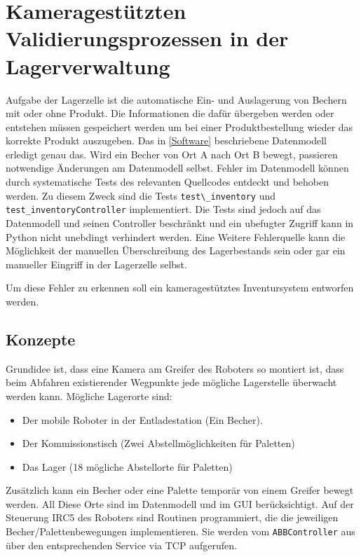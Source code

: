 \chapter{Kameragestützten Validierungsprozessen in der Lagerverwaltung}\label{KameragestützteInventur}

Aufgabe der Lagerzelle ist die automatische Ein- und Auslagerung von Bechern mit oder ohne Produkt.
Die Informationen die dafür übergeben werden oder entstehen müssen gespeichert werden um bei einer Produktbestellung wieder das korrekte Produkt auszugeben.
Das in \ref{Software} beschriebene Datenmodell erledigt genau das. Wird ein Becher von Ort A nach Ort B bewegt, 
passieren notwendige Änderungen am Datenmodell selbst. Fehler im Datenmodell können durch systematische Tests des relevanten Quellcodes entdeckt und behoben werden. 
Zu diesem Zweck sind die Tests \verb|test\_inventory| und \verb|test_inventoryController| implementiert. 
Die Tests sind jedoch auf das Datenmodell und seinen Controller beschränkt und ein \glq ubefugter \grq Zugriff kann in Python nicht unebdingt verhindert werden. 
Eine Weitere Fehlerquelle kann die Möglichkeit der manuellen Überschreibung des Lagerbestands sein oder gar ein manueller Eingriff in der Lagerzelle selbst. 

Um diese Fehler zu erkennen soll ein kameragestütztes Inventursystem entworfen werden. 
    \section {Konzepte}
    Grundidee ist, dass eine Kamera am Greifer des Roboters so montiert ist, dass beim Abfahren existierender Wegpunkte jede mögliche Lagerstelle überwacht werden kann. 
    Mögliche Lagerorte sind:
    \begin{itemize}
        \item Der mobile Roboter in der Entladestation (Ein Becher). 
        \item Der Kommissionstisch (Zwei Abstellmöglichkeiten für Paletten)
        \item Das Lager (18 mögliche Abstellorte für Paletten)
    \end{itemize}
    Zusätzlich kann ein Becher oder eine Palette temporär von einem Greifer bewegt werden. All Diese Orte sind im Datenmodell und im GUI berücksichtigt. 
    Auf der Steuerung IRC5 des Roboters sind Routinen programmiert, die die jeweiligen Becher/Palettenbewegungen implementieren.
    Sie werden vom \verb|ABBController| aus über den entsprechenden Service via TCP aufgerufen. 

